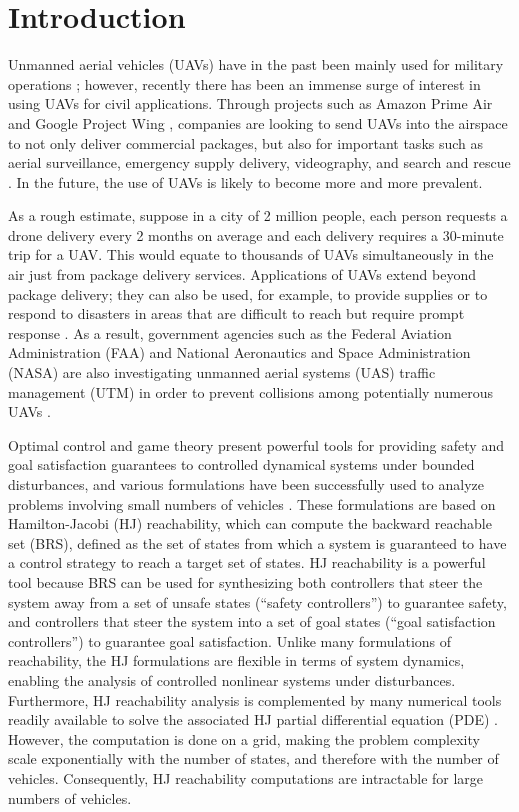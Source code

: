 \section{Introduction}
Unmanned aerial vehicles (UAVs) have in the past been mainly used for military operations \cite{Tice91, Haulman2003}; however, recently there has been an immense surge of interest in using UAVs for civil applications. Through projects such as Amazon Prime Air \cite{PrimeAir} and Google Project Wing \cite{ProjectWing}, companies are looking to send UAVs into the airspace to not only deliver commercial packages, but also for important tasks such as aerial surveillance, emergency supply delivery, videography, and search and rescue \cite{Kopardekar16}. In the future, the use of UAVs is likely to become more and more prevalent.

As a rough estimate, suppose in a city of 2 million people, each person requests a drone delivery every 2 months on average and each delivery requires a 30-minute trip for a UAV. This would equate to thousands of UAVs simultaneously in the air just from package delivery services. Applications of UAVs extend beyond package delivery; they can also be used, for example, to provide supplies or to respond to disasters in areas that are difficult to reach but require prompt response \cite{Debusk10,Tornado16}. As a result, government agencies such as the Federal Aviation Administration (FAA) and National Aeronautics and Space Administration (NASA) are also investigating unmanned aerial systems (UAS) traffic management (UTM) in order to prevent collisions among potentially numerous UAVs \cite{Kopardekar16, FAA13, NASA16}. 

Optimal control and game theory present powerful tools for providing safety and goal satisfaction guarantees to controlled dynamical systems under bounded disturbances, and various formulations \cite{Bokanowski10, Mitchell05, Barron89} have been successfully used to analyze problems involving small numbers of vehicles \cite{Fisac15, Chen14, Chen17, Ding08}. These formulations are based on Hamilton-Jacobi (HJ) reachability, which can compute the backward reachable set (BRS), defined as the set of states from which a system is guaranteed to have a control strategy to reach a target set of states. HJ reachability is a powerful tool because BRS can be used for synthesizing both controllers that steer the system away from a set of unsafe states (``safety controllers'') to guarantee safety, and controllers that steer the system into a set of goal states (``goal satisfaction controllers'') to guarantee goal satisfaction. Unlike many formulations of reachability, the HJ formulations are flexible in terms of system dynamics, enabling the analysis of controlled nonlinear systems under disturbances. Furthermore, HJ reachability analysis is complemented by many numerical tools readily available to solve the associated HJ partial differential equation (PDE) \cite{LSToolbox, Osher02, Sethian96}. However, the computation is done on a grid, making the problem complexity scale exponentially with the number of states, and therefore with the number of vehicles. Consequently, HJ reachability computations are intractable for large numbers of vehicles. 

